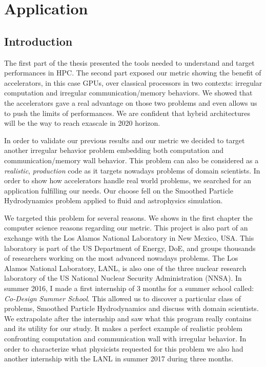 \part{Application}

\chapter*{Introduction}
The first part of the thesis presented the tools needed to understand and target performances in HPC. 
The second part exposed our metric showing the benefit of accelerators, in this case GPUs, over classical processors in two contexts: irregular computation and irregular communication/memory behaviors.
We showed that the accelerators gave a real advantage on those two problems and even allows us to push the limits of performances.
We are confident that hybrid architectures will be the way to reach exascale in 2020 horizon.

In order to validate our previous results and our metric we decided to target another irregular behavior problem embedding both computation and communication/memory wall behavior. 
This problem can also be considered as a \textit{realistic}, \textit{production} code as it targets nowadays problems of domain scientists. 
In order to show how accelerators handle real world problems, we searched for an application fulfilling our needs. 
Our choose fell on the Smoothed Particle Hydrodynamics problem applied to fluid and astrophysics simulation. 

We targeted this problem for several reasons. 
We shows in the first chapter the computer science reasons regarding our metric. 
This project is also part of an exchange with the Los Alamos National Laboratory in New Mexico, USA. 
This laboratory is part of the US Department of Energy, DoE, and groups thousands of researchers working on the most advanced nowadays problems.
The Los Alamos National Laboratory, LANL, is also one of the three nuclear research laboratory of the US National Nuclear Security Administration (NNSA). 
In summer 2016, I made a first internship of 3 months for a summer school called: \textit{Co-Design Summer School}.
This allowed us to discover a particular class of problems, Smoothed Particle Hydrodynamics and discuss with domain scientists.
We extrapolate after the internship and saw what this program really contains and its utility for our study. 
It makes a perfect example of realistic problem confronting computation and communication wall with irregular behavior. 
In order to characterize what physicists requested for this problem we also had another internship with the LANL in summer 2017 during three months. 

